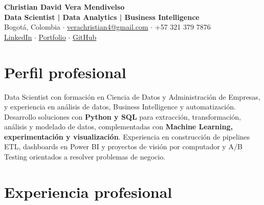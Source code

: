\documentclass[letterpaper,10pt]{article}
\begin{document}
\begin{center}
    {\Huge \textbf{Christian David Vera Mendivelso}} \\[2.5pt]
    {\large \textbf{\color{sectioncolor}Data Scientist | Data Analytics | Business Intelligence}} \\[3.5pt]
    Bogotá, Colombia \hspace{4pt}$\cdot$\hspace{4pt} \href{mailto:verachristian4@gmail.com}{verachristian4@gmail.com} \hspace{4pt}$\cdot$\hspace{4pt} +57 321 379 7876 \\
    \href{https://www.linkedin.com/in/christianveram/}{LinkedIn} \hspace{4pt}$\cdot$\hspace{4pt}
    \href{https://cveram96.github.io/Portfolio/}{Portfolio} \hspace{4pt}$\cdot$\hspace{4pt}
    \href{https://github.com/cveram96}{GitHub}
\end{center}

\vspace{-0.15cm}

\section*{Perfil profesional}
Data Scientist con formación en Ciencia de Datos y Administración de Empresas, y experiencia en análisis de datos, Business Intelligence y automatización. Desarrollo soluciones con \textbf{Python y SQL} para extracción, transformación, análisis y modelado de datos, complementadas con \textbf{Machine Learning, experimentación y visualización}. Experiencia en construcción de pipelines ETL, dashboards en Power BI y proyectos de visión por computador y A/B Testing orientados a resolver problemas de negocio.

\section*{Experiencia profesional}
\end{document}

